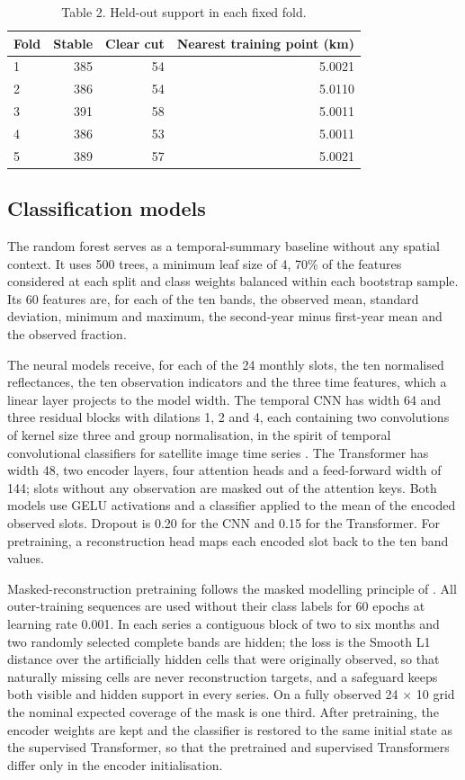 \documentclass[11pt,a4paper]{article}
\begin{document}
\begin{table}[htbp]
\centering

\caption{Table 2. Held-out support in each fixed fold.}
\begin{tabular}{lrrr}
\toprule
Fold & Stable & Clear cut & Nearest training point (km) \\ \midrule
1 & 385 & 54 & 5.0021 \\
2 & 386 & 54 & 5.0110 \\
3 & 391 & 58 & 5.0011 \\
4 & 386 & 53 & 5.0011 \\
5 & 389 & 57 & 5.0021 \\
\bottomrule
\end{tabular}
\end{table}

\subsection{Classification models}
The random forest \cite{ref5} serves as a temporal-summary baseline without any spatial context. It uses 500 trees, a minimum leaf size of 4, 70\% of the features considered at each split and class weights balanced within each bootstrap sample. Its 60 features are, for each of the ten bands, the observed mean, standard deviation, minimum and maximum, the second-year minus first-year mean and the observed fraction.

The neural models receive, for each of the 24 monthly slots, the ten normalised reflectances, the ten observation indicators and the three time features, which a linear layer projects to the model width. The temporal CNN has width 64 and three residual blocks with dilations 1, 2 and 4, each containing two convolutions of kernel size three and group normalisation, in the spirit of temporal convolutional classifiers for satellite image time series \cite{ref11}. The Transformer has width 48, two encoder layers, four attention heads and a feed-forward width of 144; slots without any observation are masked out of the attention keys. Both models use GELU activations and a classifier applied to the mean of the encoded observed slots. Dropout is 0.20 for the CNN and 0.15 for the Transformer. For pretraining, a reconstruction head maps each encoded slot back to the ten band values.

Masked-reconstruction pretraining follows the masked modelling principle of \cite{ref3,ref14}. All outer-training sequences are used without their class labels for 60 epochs at learning rate 0.001. In each series a contiguous block of two to six months and two randomly selected complete bands are hidden; the loss is the Smooth L1 distance over the artificially hidden cells that were originally observed, so that naturally missing cells are never reconstruction targets, and a safeguard keeps both visible and hidden support in every series. On a fully observed 24 $\times$ 10 grid the nominal expected coverage of the mask is one third. After pretraining, the encoder weights are kept and the classifier is restored to the same initial state as the supervised Transformer, so that the pretrained and supervised Transformers differ only in the encoder initialisation.
\end{document}
